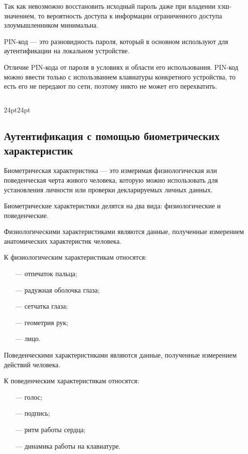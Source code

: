Так как невозможно восстановить исходный пароль даже при владении \linebreak хэш-значением, то вероятность доступа к информации ограниченного доступа злоумышленником минимальна.

PIN-код \cite{bib2} --- это разновидность пароля, который в основном используют для аутентификации на локальном устройстве.

Отличие PIN-кода от пароля в условиях и области его использования. PIN-код можно ввести только с использванием клавиатуры конкретного устройства, то есть его не передают по сети, поэтому никто не может его перехватить.

\titlespacing\subsection{\parindent}{24pt}{24pt}
\subsection{Аутентификация с помощью биометрических характеристик}
Биометрическая характеристика \cite{bib2} --- это измеримая физиологическая или поведенческая черта живого человека, которую можно использовать для установления личности или проверки декларируемых личных данных.

Биометрические характеристики делятся на два вида: физиологические и поведенческие.

Физиологическими характеристиками являются данные, полученные измерением анатомических характеристик человека.

К физиологическим характеристикам относятся:
\begin{itemize}
    \item [---] отпечаток пальца;
    \item [---] радужная оболочка глаза;
    \item [---] сетчатка глаза;
    \item [---] геометрия рук;
    \item [---] лицо.
\end{itemize}

Поведенческими характеристиками являются данные, полученные измерением действий человека.

К поведенческим характеристикам относятся:

\begin{itemize}
    \item [---] голос;
    \item [---] подпись;
    \item [---] ритм работы сердца;
    \item [---] динамика работы на клавиатуре.
\end{itemize}

